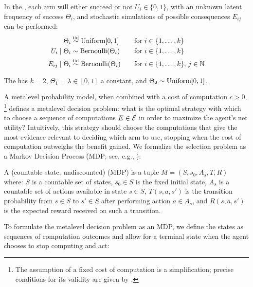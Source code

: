 \begin{example}\label{example:bernoulli}
In the ,
each arm will either succeed or not $U_i\in\{0,1\}$, with an unknown latent frequency of success $\Theta_i$, 
and stochastic simulations of possible consequences $E_{ij}$ can be performed:
\begin{align*}
	\Theta_i &\stackrel{\rm iid}{\sim} {\rm Uniform}[0,1]                      &&\quad\text{for $i\in\{1,\dots,k\}$}\\
	U_i \mid \Theta_i &\sim {\rm Bernoulli}(\Theta_i) &&\quad\text{for $i\in\{1,\dots,k\}$}\\
	E_{ij} \mid \Theta_i &\stackrel{\rm iid}{\sim} {\rm Bernoulli}(\Theta_i) &&\quad\text{for $i\in\{1,\dots,k\}$, $j\in\mathbb{N}$}
\end{align*}

The  has $k=2$,
$\Theta_1=\lambda\in[0,1]$ a constant, and $\Theta_2\sim{\rm Uniform}[0,1]$.
\end{example}

A metalevel probability model, when combined with a cost of computation $c>0$,%
\footnote{The assumption of a fixed cost of computation is a simplification; 
	precise conditions for its validity are given by \citet{Harada:1997}.} 
defines a metalevel decision problem: what is the optimal strategy with which to choose a sequence 
of computations $E\in\mathcal{E}$ in order to maximize the agent's net utility?
Intuitively, this strategy should choose the computations that give the most evidence relevant
to deciding which arm to use, stopping when the cost of computation 
outweighs the benefit gained. We formalize the selection problem as a Markov Decision Process (MDP; 
see, e.g., \citet{Puterman:1994}):

\begin{dfn}
A (countable state, undiscounted)  (MDP) is a tuple $M=(S,s_0,A_s,T,R)$ where:
	$S$ is a countable set of states,
	$s_0\in S$ is the fixed initial state,
	$A_s$ is a countable set of actions available in state $s\in S$,
	$T(s,a,s')$ is the transition probability from $s\in S$ to $s'\in S$ after performing action $a\in A_s$,
	and $R(s,a,s')$ is the expected reward received on such a transition.
\end{dfn}

To formulate the metalevel decision problem as an MDP, we define the states as sequences of
computation outcomes and allow for a terminal state when the agent chooses to stop computing and act:

